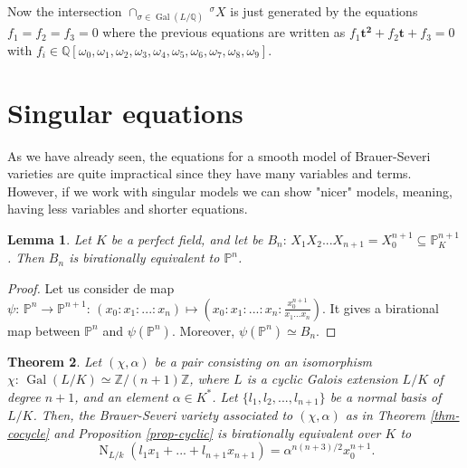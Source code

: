\documentclass[a4paper,10pt]{amsart}
\theoremstyle{plain}
\newtheorem{theorem}{Theorem}[section]
\newtheorem{lemma}[theorem]{Lemma}
\theoremstyle{definition}
\theoremstyle{remark}
\numberwithin{equation}{section}
\begin{document}
\normalsize

Now the intersection $\cap_{\sigma\in\operatorname{Gal}(L/{\mathbb{Q}})}\,^{\sigma}X$ is just generated by the equations $f_1=f_2=f_3=0$ where the previous equations are written as $f_1\pmb{t^2}+f_2\pmb{t}+f_3=0$ with $f_i\in{\mathbb{Q}}[\omega_0,\omega_1,\omega_2,\omega_3,\omega_4,\omega_5,\omega_6,\omega_7,\omega_8,\omega_9]$.

\section{Singular equations}
As we have already seen, the equations for a smooth model of Brauer-Severi varieties are quite impractical since they have many variables and terms. However, if we work with singular models we can show "nicer" models, meaning, having less variables and shorter equations.

\begin{lemma}\label{singular_modelPn} Let $K$ be a perfect field, and let be $B_n:\,X_{1}X_{2}...X_{n+1}=X_{0}^{n+1}\subseteq\mathbb{P}^{n+1}_K$. Then $B_n$ is birationally equivalent to $\mathbb{P}^{n}$.
\end{lemma}
\begin{proof} Let us consider de map $\psi:\,\mathbb{P}^n\rightarrow\mathbb{P}^{n+1}:\,(x_0:x_1:...:x_n)\mapsto (x_0:x_1:...:x_n:\frac{x_{0}^{n+1}}{x_1...x_{n}})$. It gives a birational map between $\mathbb{P}^n$ and $\psi(\mathbb{P}^n)$. Moreover, $\psi(\mathbb{P}^n)\simeq B_n$. 
\end{proof}

\begin{theorem}\label{thm-singularmodel}
	Let $(\chi,\alpha)$ be a pair consisting on an isomorphism $\chi:\,\operatorname{Gal}(L/K)\simeq\mathbb{Z}/(n+1)\mathbb{Z}$, where $L$ is a cyclic Galois extension $L/K$ of degree $n+1$, and an element $\alpha\in K^{*}$. Let $\{l_1,l_2,...,l_{n+1}\}$ be a normal basis of $L/K$. Then, the Brauer-Severi variety associated to $(\chi,\alpha)$ as in Theorem \ref{thm-cocycle} and Proposition \ref{prop-cyclic} is birationally equivalent over $K$ to
	$$
	\operatorname{N}_{L/k}(l_1x_1+...+l_{n+1}x_{n+1})=\alpha^{n(n+3)/2}x_{0}^{n+1}.
	$$
\end{theorem}
\end{document}

